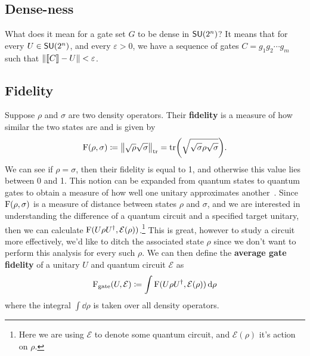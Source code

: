 \subsection{Dense-ness}

What does it mean for a gate set $G$ to be dense in $\mathsf{SU} (2^n)$?
It means that for every $U \in \mathsf{SU} (2^n)$, and every $\varepsilon > 0$, we have a sequence of gates $C = g_1g_2\cdots g_m$ such that $\norm{\llbracket C\rrbracket - U} < \varepsilon$.

\subsection{Fidelity}

Suppose $\rho$ and $\sigma$ are two density operators.
Their \textbf{fidelity} is a measure of how similar the two states are and is given by
\begin{equation}
    \operatorname{F}(\rho, \sigma) \coloneqq \norm{\sqrt{\rho}\sqrt{\sigma}}_\text{tr} = \tr(\sqrt{\sqrt{\sigma}\rho\sqrt{\sigma}}).
\end{equation}
We can see if $\rho = \sigma$, then their fidelity is equal to 1, and otherwise this value lies between 0 and 1.
This notion can be expanded from quantum states to quantum gates to obtain a measure of how well one unitary approximates another~\cite{fidelity}.
Since $\operatorname{F}(\rho, \sigma)$ is a measure of distance between states $\rho$ and $\sigma$, and we are interested in understanding the difference of a quantum circuit and a specified target unitary, then we can calculate $\operatorname{F}(U\rho U^\dagger, \mathcal{E}(\rho))$.\footnote{Here we are using $\mathcal{E}$ to denote some quantum circuit, and $\mathcal{E}(\rho)$ it's action on $\rho$.}
This is great, however to study a circuit more effectively, we'd like to ditch the associated state $\rho$ since we don't want to perform this analysis for every such $\rho$.
We can then define the \textbf{average gate fidelity} of a unitary $U$ and quantum circuit $\mathcal{E}$ as
\begin{equation}
    \operatorname{F}_\text{gate}(U, \mathcal{E}) \coloneqq \int \operatorname{F}(U\rho U^\dagger, \mathcal{E}(\rho))\dd{\rho}
\end{equation}
where the integral $\int\dd{\rho}$ is taken over all density operators. %
